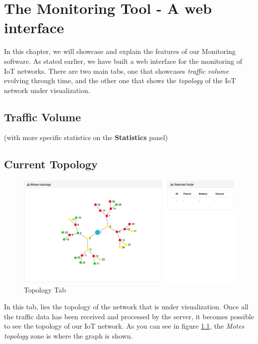 \chapter{The Monitoring Tool - A web interface}

In this chapter, we will showcase and explain the features of our Monitoring software. As stated earlier, we have built a web interface for the monitoring of IoT networks. There are two main tabs, one that showcases \textit{traffic volume} evolving through time, and the other one that shows the \textit{topology} of the IoT network under visualization.

\section{Traffic Volume}
(with more specific statistics on the \textbf{Statistics} panel)

\section{Current Topology}

\begin{figure}[!h]
	\centering
	\includegraphics[width=1.1\textwidth]{res/topologyinterface.png}
	\caption{Topology Tab}
	\label{fig:topo}
\end{figure}

In this tab, lies the topology of the network that is under visualization. Once all the traffic data has been received and processed by the server, it becomes possible to see the topology of our IoT network. As you can see in figure \ref{fig:topo}, the \textit{Motes topology} zone is where the graph is shown. \\

